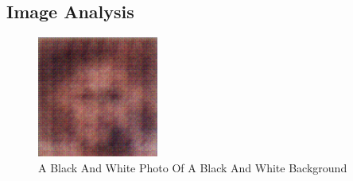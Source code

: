 \documentclass{article}%
\begin{document}
%
\subsection{Image Analysis}%
\label{subsec:ImageAnalysis}%


\begin{figure}[h!]%
\centering%
\includegraphics[width=150px]{500_fake_images/samples_5_243.png}%
\caption{A Black And White Photo Of A Black And White Background}%
\end{figure}

%
\end{document}
